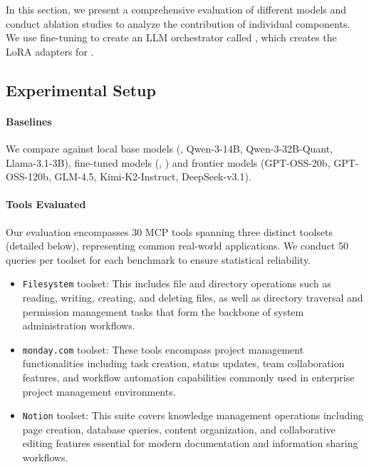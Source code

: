 In this section, we present a comprehensive evaluation of different models and conduct ablation studies to analyze the contribution of individual components. We use \sys{} fine-tuning to create an LLM orchestrator called \sysmodel{}, which creates the LoRA adapters for \baselinemodel{}. 

\subsection{Experimental Setup}
\paragraph{Baselines}
We compare \sysmodel{} against local base models (\baselinemodel{}, Qwen-3-14B, Qwen-3-32B-Quant, Llama-3.1-3B), fine-tuned models (\toolace{}, \xlam{}) and frontier models (GPT-OSS-20b, GPT-OSS-120b, GLM-4.5, Kimi-K2-Instruct, DeepSeek-v3.1). 

\paragraph{Tools Evaluated}
Our evaluation encompasses 30 MCP tools spanning three distinct toolsets (detailed below), representing common real-world applications. We conduct 50 queries per toolset for each benchmark to ensure statistical reliability.

\begin{itemize}
    \item \texttt{Filesystem} toolset: This includes file and directory operations such as reading, writing, creating, and deleting files, as well as directory traversal and permission management tasks that form the backbone of system administration workflows.

    \item \texttt{monday.com} toolset: These tools encompass project management functionalities including task creation, status updates, team collaboration features, and workflow automation capabilities commonly used in enterprise project management environments.

    \item \texttt{Notion} toolset: This suite covers knowledge management operations including page creation, database queries, content organization, and collaborative editing features essential for modern documentation and information sharing workflows.
    
\end{itemize}

